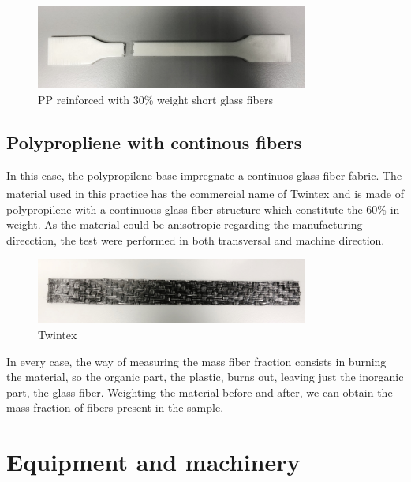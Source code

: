 \begin{figure}[h]
	\centering
	\includegraphics[width=0.8\textwidth]{img/2_PP_short_glass_fibre.jpg}
	\caption[short caption]{PP reinforced with 30\% weight short glass fibers}
	\label{fig:PP30}
\end{figure}

\subsection{Polypropliene with continous fibers}

In this case, the polypropilene base impregnate a continuos glass fiber fabric.
The material used in this practice has the commercial name of Twintex\textsuperscript{\tiny\textregistered}
and is made of polypropilene with a continuous glass fiber structure which constitute
the 60\% in weight. As the material could be anisotropic regarding the manufacturing
direcction, the test were performed in both transversal and machine direction.\\

\begin{figure}[h]
	\centering
	\includegraphics[width=0.8\textwidth]{img/3_Twintex.jpg}
	\caption[short caption]{Twintex}
	\label{fig:twintex}
\end{figure}

In every case, the way of measuring the mass fiber fraction consists in burning
the material, so the organic part, the plastic, burns out, leaving just the
inorganic part, the glass fiber. Weighting the material before and after, we can
obtain the mass-fraction of fibers present in the sample.\\

\section{Equipment and machinery}

